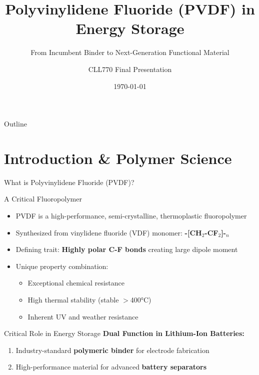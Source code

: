 \documentclass[aspectratio=169]{beamer}
\title[PVDF in Energy Storage]{Polyvinylidene Fluoride (PVDF) in Energy Storage}
\subtitle{From Incumbent Binder to Next-Generation Functional Material}
\author{CLL770 Final Presentation}
\institute{Department of Chemical Engineering}
\date{\today}%
\begin{document}
\begin{frame}[plain]
    \titlepage
\end{frame}

\begin{frame}{Outline}
    \tableofcontents
\end{frame}

\section{Introduction \& Polymer Science}

\begin{frame}{What is Polyvinylidene Fluoride (PVDF)?}
    \begin{block}{A Critical Fluoropolymer}
        \begin{itemize}
            \item PVDF is a high-performance, semi-crystalline, thermoplastic fluoropolymer
            \item Synthesized from vinylidene fluoride (VDF) monomer: \textbf{-[CH$_2$-CF$_2$]-}$_n$
            \item Defining trait: \textbf{Highly polar C-F bonds} creating large dipole moment
            \item Unique property combination:
                \begin{itemize}
                    \item Exceptional chemical resistance
                    \item High thermal stability (stable $>$400\si{\celsius})
                    \item Inherent UV and weather resistance
                \end{itemize}
        \end{itemize}
    \end{block}
    
    \begin{alertblock}{Critical Role in Energy Storage}
        \textbf{Dual Function in Lithium-Ion Batteries:}
        \begin{enumerate}
            \item Industry-standard \textbf{polymeric binder} for electrode fabrication
            \item High-performance material for advanced \textbf{battery separators}
        \end{enumerate}
    \end{alertblock}
\end{frame}
\end{document}
